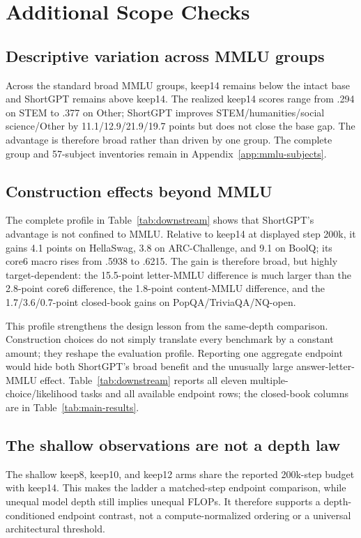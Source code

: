 \section{Additional Scope Checks}
\label{sec:analysis}

\subsection{Descriptive variation across MMLU groups}

Across the standard broad MMLU groups, keep14 remains below the intact base and
ShortGPT remains above keep14. The realized keep14 scores range from .294 on
STEM to .377 on Other; ShortGPT improves STEM/humanities/social science/Other
by 11.1/12.9/21.9/19.7 points but does not close the base gap. The advantage is
therefore broad rather than driven by one group. The complete group and
57-subject inventories remain in Appendix~\ref{app:mmlu-subjects}.

\subsection{Construction effects beyond MMLU}

The complete profile in Table~\ref{tab:downstream} shows that ShortGPT's
advantage is not confined to MMLU. Relative to keep14 at displayed step 200k,
it gains 4.1 points on HellaSwag, 3.8 on ARC-Challenge, and 9.1 on BoolQ; its
core6 macro rises from .5938 to .6215. The gain is therefore broad, but highly
target-dependent: the 15.5-point letter-MMLU difference is much larger than the
2.8-point core6 difference, the 1.8-point content-MMLU difference, and the
1.7/3.6/0.7-point closed-book gains on PopQA/TriviaQA/NQ-open.

This profile strengthens the design lesson from the same-depth comparison.
Construction choices do not simply translate every benchmark by a constant
amount; they reshape the evaluation profile. Reporting one aggregate endpoint
would hide both ShortGPT's broad benefit and the unusually large
answer-letter-MMLU effect. Table~\ref{tab:downstream} reports all eleven
multiple-choice/likelihood tasks and all available endpoint rows; the
closed-book columns are in Table~\ref{tab:main-results}.

\subsection{The shallow observations are not a depth law}
The shallow keep8, keep10, and keep12 arms share the reported 200k-step budget
with keep14. This makes the ladder a matched-step endpoint comparison, while
unequal model depth still implies unequal FLOPs. It therefore supports a
depth-conditioned endpoint contrast, not a compute-normalized ordering or a
universal architectural threshold.

